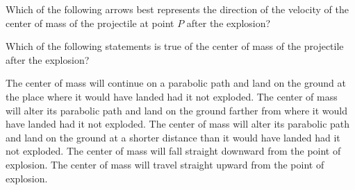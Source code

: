 \documentclass{../../oss-apphys-exam}
\begin{document}
\begin{multicols*}{2}
\begin{questions}


    \question Which of the following arrows best represents the direction of the
    velocity of the center of mass of the projectile at point $P$ after the
    explosion?
    \label{cm1}
    \begin{choices}
      \choice{\huge$\leftarrow$}
      \choice{\huge$\swarrow$}
      \choice{\huge$\searrow$}
      \choice{\huge$\rightarrow$}
      \choice{\huge$\nearrow$}
    \end{choices}
    
    \question Which of the following statements is true of the center of mass
    of the projectile after the explosion?
    \label{cm2}
    \begin{choices}
      \choice The center of mass will continue on a parabolic path and land on
      the ground at the place where it would have landed had it not exploded.
      \choice The center of mass will alter its parabolic path and land on the
      ground farther from where it would have landed had it not exploded.
      \choice The center of mass will alter its parabolic path and land on the
      ground at a shorter distance than it would have landed had it not
      exploded.
      \choice The center of mass will fall straight downward from the point of
      explosion.
      \choice The center of mass will travel straight upward from the point of
      explosion.
    \end{choices}
    \vspace{.7in}
    

\end{questions}
\end{multicols*}
\end{document}
